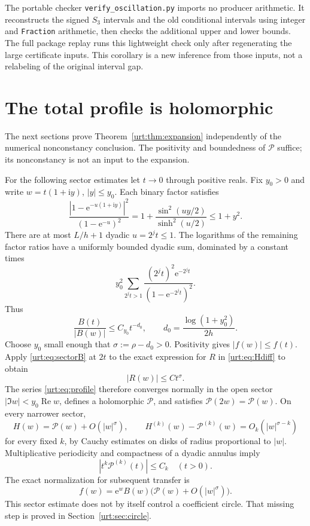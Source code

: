 \documentclass[11pt,letterpaper]{article}
\theoremstyle{remark}\newtheorem{remark}[theorem]{Remark}
\newcommand{\Pc}{\mathcal P}\newcommand{\Bc}{\mathcal B}\newcommand{\dd}{\mathrm d}
\newcommand{\ii}{\mathrm i}\newcommand{\ee}{\mathrm e}\newcommand{\ZZ}{\mathbb Z}\newcommand{\NN}{\mathbb N}
\DeclareMathOperator{\Rea}{Re}
\begin{document}
The portable checker \texttt{verify\_oscillation.py} imports no producer arithmetic. It reconstructs the signed $S_3$ intervals and the old conditional intervals using integer and \texttt{Fraction} arithmetic, then checks the additional upper and lower bounds. The full package replay runs this lightweight check only after regenerating the large certificate inputs. This corollary is a new inference from those inputs, not a relabeling of the original interval gap.

\section{The total profile is holomorphic}\label{urt:sec:holomorphic}
The next sections prove Theorem~\ref{urt:thm:expansion} independently of the numerical nonconstancy conclusion. The positivity and boundedness of $\Pc$ suffice; its nonconstancy is not an input to the expansion.

For the following sector estimates let $t\to0$ through positive reals. Fix $y_0>0$ and write $w=t(1+\ii y)$, $|y|\le y_0$. Each binary factor satisfies
\[
 \frac{|1-\ee^{-u(1+\ii y)}|^2}{(1-\ee^{-u})^2}
 =1+\frac{\sin^2(uy/2)}{\sinh^2(u/2)}\le1+y^2.
\]
There are at most $L/h+1$ dyadic $u=2^jt\le1$. The logarithms of the remaining factor ratios have a uniformly bounded dyadic sum, dominated by a constant times
\[
 y_0^2\sum_{2^jt>1}\frac{(2^jt)^2\ee^{-2^jt}}{(1-\ee^{-2^jt})^2}.
\]
Thus
\begin{equation}\label{urt:eq:sectorB}
 \frac{B(t)}{|B(w)|}\le C_{y_0}t^{-d_0},\qquad
 d_0=\frac{\log(1+y_0^2)}{2h}.
\end{equation}
Choose $y_0$ small enough that $\sigma:=\rho-d_0>0$. Positivity gives $|f(w)|\le f(t)$. Apply \eqref{urt:eq:sectorB} at $2t$ to the exact expression for $R$ in \eqref{urt:eq:Hdiff} to obtain
\begin{equation}\label{urt:eq:Rsector}
 |R(w)|\le C t^\sigma.
\end{equation}
The series \eqref{urt:eq:profile} therefore converges normally in the open sector $|\Im w|<y_0\Rea w$, defines a holomorphic $\Pc$, and satisfies $\Pc(2w)=\Pc(w)$. On every narrower sector,
\begin{equation}\label{urt:eq:sectorH}
 H(w)=\Pc(w)+O(|w|^\sigma),\qquad
 H^{(k)}(w)-\Pc^{(k)}(w)=O_k(|w|^{\sigma-k})
\end{equation}
for every fixed $k$, by Cauchy estimates on disks of radius proportional to $|w|$. Multiplicative periodicity and compactness of a dyadic annulus imply
\begin{equation}\label{urt:eq:Pderivs}
 |t^k\Pc^{(k)}(t)|\le C_k\quad(t>0).
\end{equation}
The exact normalization for subsequent transfer is
\begin{equation}\label{urt:eq:sectorf}
 f(w)=\ee^w B(w)\bigl(\Pc(w)+O(|w|^\sigma)\bigr).
\end{equation}
This sector estimate does not by itself control a coefficient circle. That missing step is proved in Section~\ref{urt:sec:circle}.
\end{document}
